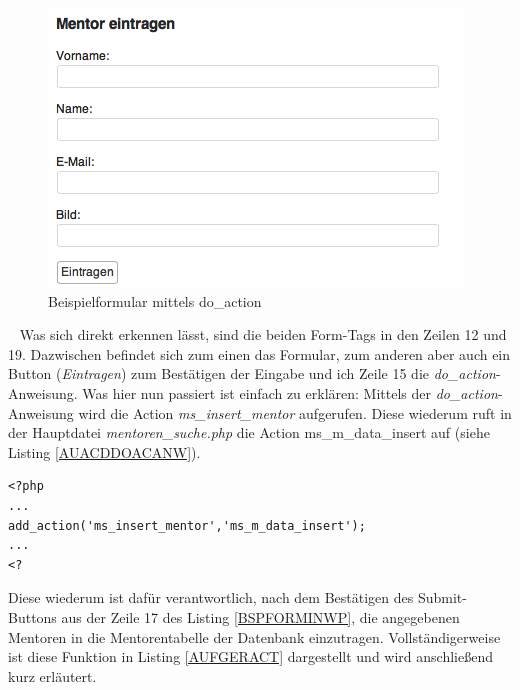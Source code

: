   \begin{figure}[htbp]
	\begin{center}
	\includegraphics[angle={360}, scale=0.46]{pictures/formwp.png}
	    \caption{Beispielformular mittels do\_action}
	    \label{img:BSPFORMWP}
	\end{center}
   \end{figure}\ \newline
Was sich direkt erkennen lässt, sind die beiden Form-Tags in den Zeilen 12 und 19. Dazwischen befindet sich zum einen das Formular, zum anderen aber auch ein Button (\emph{Eintragen}) zum Bestätigen der Eingabe und ich Zeile 15 die \emph{do\_action}-Anweisung.\newline
Was hier nun passiert ist einfach zu erklären: Mittels der \emph{do\_action}-Anweisung wird die Action \emph{ms\_insert\_mentor} aufgerufen. Diese wiederum ruft in der Hauptdatei \emph{mentoren\_suche.php} die Action ms\_m\_data\_insert auf (siehe Listing \ref{AUACDDOACANW}).
\begin{lstlisting}
<?php
...
add_action('ms_insert_mentor','ms_m_data_insert');
...
<?
\end{lstlisting}
Diese wiederum ist dafür verantwortlich, nach dem Bestätigen des Submit-Buttons aus der Zeile 17 des Listing \ref{BSPFORMINWP}, die angegebenen Mentoren in die Mentorentabelle der Datenbank einzutragen.\newline
Vollständigerweise ist diese Funktion in Listing \ref{AUFGERACT} dargestellt und wird anschließend kurz erläutert.
